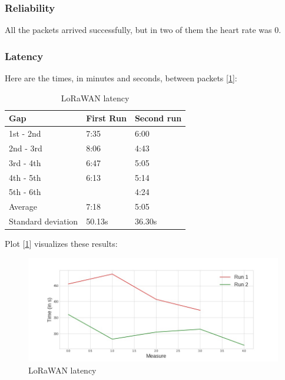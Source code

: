 		\subsubsection{Reliability}
			All the packets arrived successfully, but in two of them the heart rate was 0.

		\subsubsection{Latency}
			Here are the times, in minutes and seconds, between packets [\ref{fig:Latency}]:
			\begin{table}[h!]
				\centering
				\begin{tabular}{@{}lll@{}}
					\toprule
					\textbf{Gap}&\textbf{First Run}& \textbf{Second run} 	 \\ \midrule
					1st - 2nd 			&	7:35		& 	6:00     	 \\
					2nd - 3rd 			&	8:06    	& 	4:43         \\
					3rd - 4th 			&	6:47		& 	5:05         \\
					4th - 5th 			&	6:13    	& 	5:14         \\
					5th - 6th 			&	         	& 	4:24         \\ \bottomrule
					Average     		&   7:18        &   5:05		 \\
					Standard deviation  &   50.13s      &   36.30s		 \\ \bottomrule
				\end{tabular}
				\caption[LoRaWAN latency]{LoRaWAN latency}
				\label{tab:Latency}
			\end{table}
			
			Plot [\ref{fig:Latency}] visualizes these results:
			\begin{figure}[h!]
				\centering
				\includegraphics[width=1.1\linewidth]{gfx/latency_diff.jpg}
				\caption{LoRaWAN latency}
				\label{fig:Latency}
			\end{figure}

